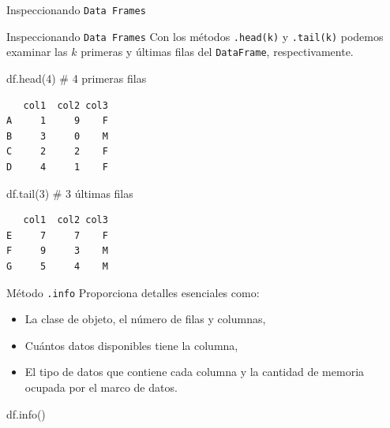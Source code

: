 \documentclass[
  ignorenonframetext,
  aspectratio=169,
  spanish,
]{beamer}
\newenvironment{Shaded}{\begin{snugshade}}{\end{snugshade}}
\newcommand{\CommentTok}[1]{\textcolor[rgb]{0.37,0.37,0.37}{#1}}
\newcommand{\DecValTok}[1]{\textcolor[rgb]{0.68,0.00,0.00}{#1}}
\newcommand{\NormalTok}[1]{\textcolor[rgb]{0.00,0.23,0.31}{#1}}
\begin{document}
\begin{frame}[fragile]{Inspeccionando \texttt{Data\ Frames}}
\begin{block}{Inspeccionando \texttt{Data\ Frames}}
\label{inspeccionando-data-frames-1}
Con los métodos \texttt{.head(k)} y \texttt{.tail(k)} podemos examinar
las \(k\) primeras y últimas filas del \texttt{DataFrame},
respectivamente. 

\begin{Shaded}
\begin{Highlighting}[]
\NormalTok{df.head(}\DecValTok{4}\NormalTok{) }\CommentTok{\# 4 primeras filas }
\end{Highlighting}
\end{Shaded}

\begin{verbatim}
   col1  col2 col3
A     1     9    F
B     3     0    M
C     2     2    F
D     4     1    F
\end{verbatim}

\begin{Shaded}
\begin{Highlighting}[]
\NormalTok{df.tail(}\DecValTok{3}\NormalTok{) }\CommentTok{\# 3 últimas filas }
\end{Highlighting}
\end{Shaded}

\begin{verbatim}
   col1  col2 col3
E     7     7    F
F     9     3    M
G     5     4    M
\end{verbatim}
\end{block}

\begin{block}{Método \texttt{.info}}
\label{muxe9todo-.info}
Proporciona detalles esenciales como:

\begin{itemize}
\item
  La clase de objeto, el número de filas y columnas,
\item
  Cuántos datos disponibles tiene la columna,
\item
  El tipo de datos que contiene cada columna y la cantidad de memoria
  ocupada por el marco de datos.
\end{itemize}

\begin{Shaded}
\begin{Highlighting}[]
\NormalTok{df.info()}
\end{Highlighting}
\end{Shaded}


\end{block}
\end{frame}
\end{document}
